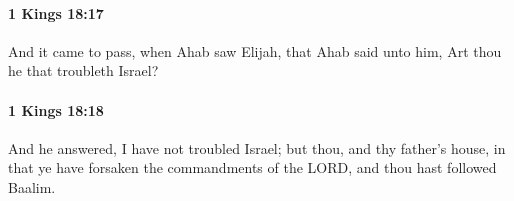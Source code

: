 		\paragraph{1 Kings 18:17} %
			\label{1KINGS-18-17}

			And it came to pass, when Ahab saw Elijah, that Ahab said unto him, Art thou he that troubleth Israel?


		\paragraph{1 Kings 18:18} %
			\label{1KINGS-18-18}

			And he answered, I have not troubled Israel; but thou, and thy father’s house, in that ye have forsaken the commandments of the LORD, and thou hast followed Baalim.


